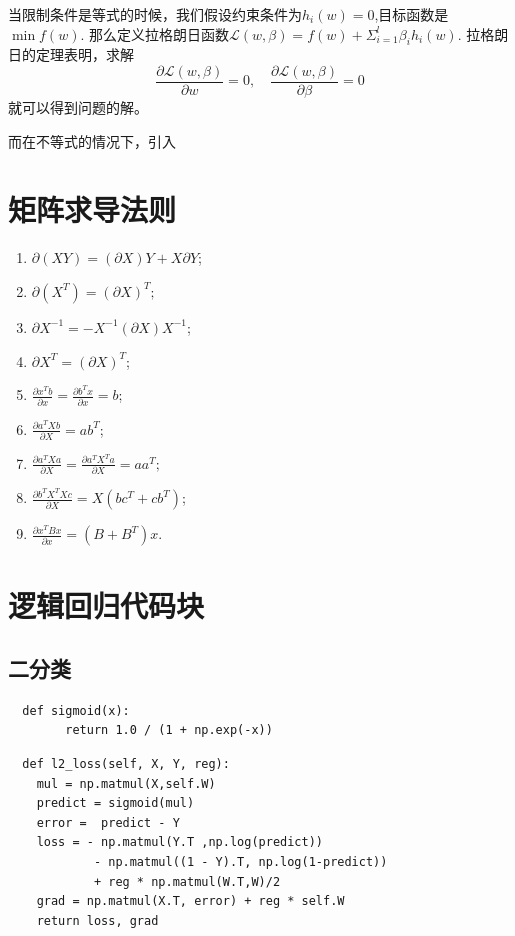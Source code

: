 当限制条件是等式的时候，我们假设约束条件为$h_i(w) = 0$,目标函数是$\min f(w)$. 那么定义拉格朗日函数$\mathcal L(w,\beta) = f(w) + \Sigma_{i=1}^l\beta_ih_i(w)$. 拉格朗日的定理表明，求解
$$\frac{\partial\mathcal L(w,\beta)}{\partial w} = 0,\quad \frac{\partial\mathcal L(w,\beta)}{\partial \beta} = 0$$
就可以得到问题的解。

而在不等式的情况下，引入



\newpage
\appendix

\section{矩阵求导法则}
\label{matrix gradient}
\begin{enumerate}
  \item $\partial (XY) = (\partial X)Y + X\partial Y$;
  \item $\partial (X^T) = (\partial X)^T;$
  \item $\partial X^{-1} = -X^{-1}(\partial X)X^{-1}$;
  \item $\partial X^T = (\partial X)^T$;
  \item $\displaystyle \frac{\partial x^T b}{\partial x} = \displaystyle\frac{\partial b^T x}{\partial x} = b$;
  \item $\displaystyle \frac{\partial a^TXb}{\partial X} = ab^T$;
  \item $\displaystyle \frac{\partial a^TXa}{\partial X} = \frac{\partial a^TX^Ta}{\partial X} = aa^T;$
  \item $\displaystyle \frac{\partial b^TX^TXc}{\partial X} = X(bc^T+cb^T)$;
  \item $\displaystyle \frac{\partial x^TBx}{\partial x} = (B+B^T)x$.
\end{enumerate}
\section{逻辑回归代码块}
\subsection{二分类}
\begin{lstlisting}
  def sigmoid(x):
        return 1.0 / (1 + np.exp(-x))
\end{lstlisting}
\begin{lstlisting}
  def l2_loss(self, X, Y, reg):
    mul = np.matmul(X,self.W)
    predict = sigmoid(mul)
    error =  predict - Y
    loss = - np.matmul(Y.T ,np.log(predict)) 
            - np.matmul((1 - Y).T, np.log(1-predict)) 
            + reg * np.matmul(W.T,W)/2 
    grad = np.matmul(X.T, error) + reg * self.W
    return loss, grad
\end{lstlisting}

